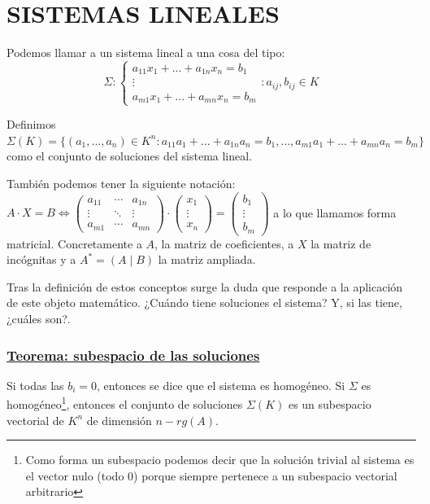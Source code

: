 \documentclass[10pt,a4paper,openright]{book}
\begin{document}
\chapter*{SISTEMAS LINEALES}
Podemos llamar a un sistema lineal a una cosa del tipo:
$$\Sigma: \begin{cases}a_{11} x_1+...+a_{1n}x_n=b_1 \\ \vdots \\ a_{m1}x_1+...+a_{mn}x_n=b_m\end{cases}: a_{ij}, b_{ij}\in K$$

Definimos $\Sigma(K)=\{(a_1, ..., a_n)\in K^n: a_{11}a_1+...+a_{1n}a_n=b_1, ..., a_{m1}a_1+...+a_{mn}a_n=b_m\}$ como el conjunto de soluciones del sistema lineal.

También podemos tener la siguiente notación: $A\cdot X=B\Leftrightarrow \begin{pmatrix}
a_{11} &\cdots & a_{1n} \\ \vdots & \ddots & \vdots \\ a_{m1}  & \cdots & a_{mn}\end{pmatrix} \cdot \begin{pmatrix}
x_1 \\ \vdots \\ x_n
\end{pmatrix}=\begin{pmatrix}
b_1 \\ \vdots \\ b_m
\end{pmatrix}$ a lo que llamamos forma matricial.  Concretamente a $A$, la matriz de coeficientes, a $X$ la matriz de incógnitas y a $A^*=(A\mid B)$ la matriz ampliada.

Tras la definición de estos conceptos surge la duda que responde a la aplicación de este objeto matemático. ¿Cuándo tiene soluciones el sistema? Y, si las tiene, ¿cuáles son?.

\subsection*{\underline{Teorema: subespacio de las soluciones}}
Si todas las $b_i=0$, entonces se dice que el sistema es homogéneo. Si $\Sigma$ es homogéneo\footnote{Como forma un subespacio podemos decir que la solución trivial al sistema es el vector nulo (todo 0) porque siempre pertenece a un subespacio vectorial arbitrario}, entonces el conjunto de soluciones $\Sigma(K)$ es un subespacio vectorial de $K^n$ de dimensión $n-rg(A)$. 
\end{document}
